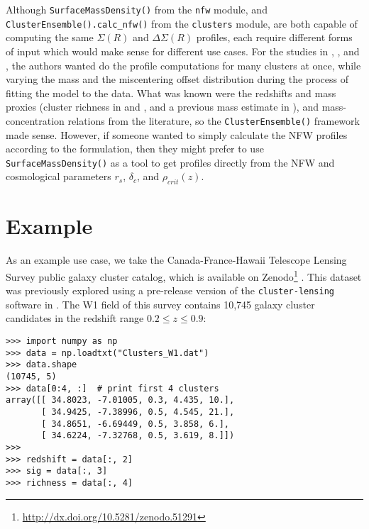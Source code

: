 \documentclass[twocolumn]{aastex6}
\newcommand{\code}{\lstinline[style=codeintext]}
\begin{document}
Although \code{SurfaceMassDensity()} from the \code{nfw} module, and \code{ClusterEnsemble().calc_nfw()} from the \code{clusters} module, are both capable of computing the same $\Sigma(R)$ and $\Delta\Sigma(R)$ profiles, each require different forms of input which would make sense for different use cases. For the studies in \citet{Ford15}, \citet{Ford14}, and \citet{Ford12}, the authors wanted do the profile computations for many clusters at once, while varying the mass and the miscentering offset distribution during the process of fitting the model to the data. What was known were the redshifts and mass proxies (cluster richness in \citealt{Ford15} and \citealt{Ford14}, and a previous mass estimate in \citealt{Ford12}), and mass-concentration relations from the literature, so the \code{ClusterEnsemble()} framework made sense. However, if someone wanted to simply calculate the NFW profiles according to the \citet{Wright00} formulation, then they might prefer to use \code{SurfaceMassDensity()} as a tool to get profiles directly from the NFW and cosmological parameters $r_s$, $\delta_c$, and $\rho_{crit}(z)$.


\section{Example}
\label{ex}
As an example use case, we take the Canada-France-Hawaii Telescope Lensing Survey \citep[CFHTLenS;][]{Heymans12, Erben13} public galaxy cluster catalog, which is available on Zenodo\footnote{\url{http://dx.doi.org/10.5281/zenodo.51291}} \citep{3DMFcatalog}. This dataset was previously explored using a pre-release version of the \code{cluster-lensing} software in \citet{Ford14, Ford15}. The W1 field of this survey contains 10,745 galaxy cluster candidates in the redshift range $0.2 \le z \le 0.9$:
\begin{verbatim}
>>> import numpy as np
>>> data = np.loadtxt("Clusters_W1.dat")
>>> data.shape
(10745, 5)
>>> data[0:4, :]  # print first 4 clusters
array([[ 34.8023, -7.01005, 0.3, 4.435, 10.],
       [ 34.9425, -7.38996, 0.5, 4.545, 21.],
       [ 34.8651, -6.69449, 0.5, 3.858, 6.],
       [ 34.6224, -7.32768, 0.5, 3.619, 8.]])
>>>
>>> redshift = data[:, 2]
>>> sig = data[:, 3]
>>> richness = data[:, 4]
\end{verbatim}
\end{document}
